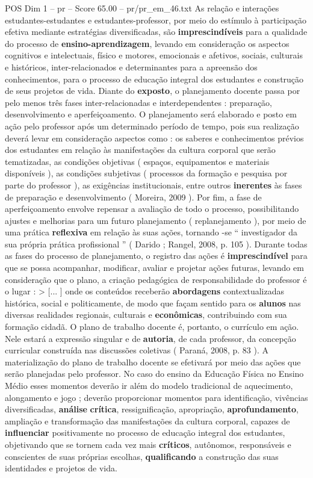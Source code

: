 \begin{textsample}{POS Dim 1 – pr – Score 65.00 – pr/pr\_em\_46.txt}
As relação e interações estudantes-estudantes e estudantes-professor, por meio do estímulo à participação efetiva mediante estratégias diversificadas, são \textbf{imprescindíveis} para a qualidade do processo de \textbf{ensino-aprendizagem}, levando em consideração os aspectos cognitivos e intelectuais, físico e motores, emocionais e afetivos, sociais, culturais e históricos, inter-relacionados e determinantes para a apreensão dos conhecimentos, para o processo de educação integral dos estudantes e construção de seus projetos de vida.
Diante do \textbf{exposto}, o planejamento docente passa por pelo menos três fases inter-relacionadas e interdependentes : preparação, desenvolvimento e aperfeiçoamento.
O planejamento será elaborado e posto em ação pelo professor após um determinado período de tempo, pois sua realização deverá levar em consideração aspectos como : os saberes e conhecimentos prévios dos estudantes em relação às manifestações da cultura corporal que serão tematizadas, as condições objetivas ( espaços, equipamentos e materiais disponíveis ), as condições subjetivas ( processos da formação e pesquisa por parte do professor ), as exigências institucionais, entre outros \textbf{inerentes} às fases de preparação e desenvolvimento ( Moreira, 2009 ).
Por fim, a fase de aperfeiçoamento envolve repensar a avaliação de todo o processo, possibilitando ajustes e melhorias para um futuro planejamento ( replanejamento ), por meio de uma prática \textbf{reflexiva} em relação às suas ações, tornando -se “ investigador da sua própria prática profissional ” ( Darido ; Rangel, 2008, p. 105 ).
Durante todas as fases do processo de planejamento, o registro das ações é \textbf{imprescindível} para que se possa acompanhar, modificar, avaliar e projetar ações futuras, levando em consideração que o plano, a criação pedagógica de responsabilidade do professor é o lugar : > [... ] onde os conteúdos receberão \textbf{abordagens} contextualizadas histórica, social e politicamente, de modo que façam sentido para os \textbf{alunos} nas diversas realidades regionais, culturais e \textbf{econômicas}, contribuindo com sua formação cidadã.
O plano de trabalho docente é, portanto, o currículo em ação.
Nele estará a expressão singular e de \textbf{autoria}, de cada professor, da concepção curricular construída nas discussões coletivas ( Paraná, 2008, p. 83 ).
A materialização do plano de trabalho docente se efetivará por meio das ações que serão planejadas pelo professor.
No caso do ensino da Educação Física no Ensino Médio esses momentos deverão ir além do modelo tradicional de aquecimento, alongamento e jogo ; deverão proporcionar momentos para identificação, vivências diversificadas, \textbf{análise} \textbf{crítica}, ressignificação, apropriação, \textbf{aprofundamento}, ampliação e transformação das manifestações da cultura corporal, capazes de \textbf{influenciar} positivamente no processo de educação integral dos estudantes, objetivando que se tornem cada vez mais \textbf{críticos}, autônomos, responsáveis e conscientes de suas próprias escolhas, \textbf{qualificando} a construção das suas identidades e projetos de vida.

\end{textsample}

